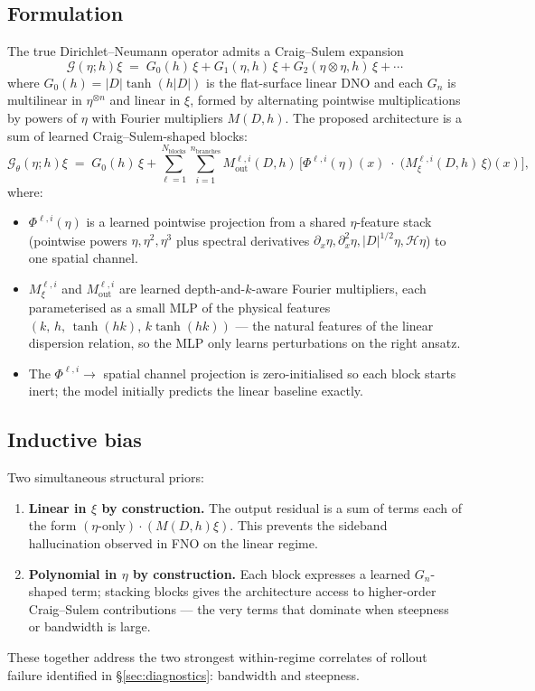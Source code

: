 \documentclass[11pt,letterpaper]{article}
\newcommand{\Gop}{\mathcal{G}}
\begin{document}
\subsection{Formulation}
The true Dirichlet--Neumann operator admits a Craig--Sulem expansion
\[
  \Gop(\eta;h)\xi \;=\; G_{0}(h)\,\xi + G_{1}(\eta,h)\,\xi
                   + G_{2}(\eta\otimes\eta,h)\,\xi + \cdots
\]
where $G_{0}(h) = |D|\tanh(h|D|)$ is the flat-surface linear DNO and each
$G_{n}$ is multilinear in $\eta^{\otimes n}$ and linear in $\xi$, formed
by alternating pointwise multiplications by powers of $\eta$ with
Fourier multipliers $M(D,h)$. The proposed architecture is a sum of
learned Craig--Sulem-shaped blocks:
\[
  \Gop_\theta(\eta;h)\xi \;=\; G_{0}(h)\,\xi
   + \sum_{\ell=1}^{N_{\mathrm{blocks}}}
      \sum_{i=1}^{n_{\mathrm{branches}}}
        M^{\ell,i}_{\mathrm{out}}(D,h)\,\Big[
          \Phi^{\ell,i}(\eta)(x)\;\cdot\;
          \bigl(M^{\ell,i}_{\xi}(D,h)\,\xi\bigr)(x)
        \Big],
\]
where:
\begin{itemize}[leftmargin=1.3em,itemsep=2pt]
  \item $\Phi^{\ell,i}(\eta)$ is a learned pointwise projection from a
        shared $\eta$-feature stack (pointwise powers
        $\eta,\eta^{2},\eta^{3}$ plus spectral derivatives
        $\partial_{x}\eta,\partial_{x}^{2}\eta,|D|^{1/2}\eta,\mathcal{H}\eta$)
        to one spatial channel.
  \item $M^{\ell,i}_{\xi}$ and $M^{\ell,i}_{\mathrm{out}}$ are learned
        depth-and-$k$-aware Fourier multipliers, each parameterised as a
        small MLP of the physical features
        $(k,\,h,\,\tanh(hk),\,k\tanh(hk))$ --- the natural features of
        the linear dispersion relation, so the MLP only learns
        perturbations on the right ansatz.
  \item The $\Phi^{\ell,i}\to$ spatial channel projection is
        zero-initialised so each block starts inert; the model initially
        predicts the linear baseline exactly.
\end{itemize}

\subsection{Inductive bias}
Two simultaneous structural priors:
\begin{enumerate}[leftmargin=1.3em,itemsep=2pt]
  \item \textbf{Linear in $\xi$ by construction.} The output residual is
        a sum of terms each of the form
        $(\text{$\eta$-only})\cdot(M(D,h)\xi)$. This prevents the
        sideband hallucination observed in FNO on the linear regime.
  \item \textbf{Polynomial in $\eta$ by construction.} Each block
        expresses a learned $G_{n}$-shaped term; stacking blocks gives
        the architecture access to higher-order Craig--Sulem
        contributions --- the very terms that dominate when steepness
        or bandwidth is large.
\end{enumerate}
These together address the two strongest within-regime correlates of
rollout failure identified in \S\ref{sec:diagnostics}: bandwidth and
steepness.
\end{document}
